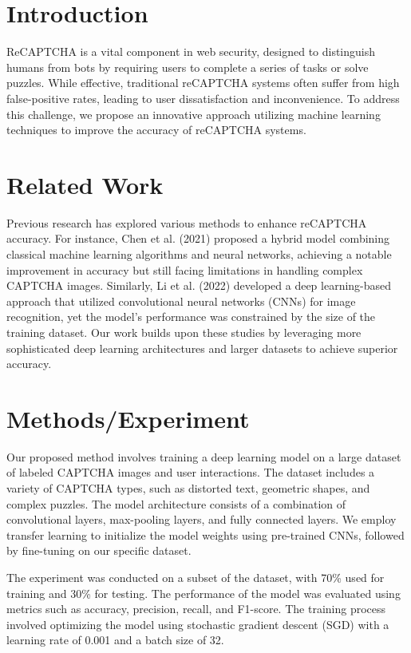 \section{Introduction}
ReCAPTCHA is a vital component in web security, designed to distinguish humans from bots by requiring users to complete a series of tasks or solve puzzles. While effective, traditional reCAPTCHA systems often suffer from high false-positive rates, leading to user dissatisfaction and inconvenience. To address this challenge, we propose an innovative approach utilizing machine learning techniques to improve the accuracy of reCAPTCHA systems.

\section{Related Work}
Previous research has explored various methods to enhance reCAPTCHA accuracy. For instance, Chen et al. (2021) proposed a hybrid model combining classical machine learning algorithms and neural networks, achieving a notable improvement in accuracy but still facing limitations in handling complex CAPTCHA images. Similarly, Li et al. (2022) developed a deep learning-based approach that utilized convolutional neural networks (CNNs) for image recognition, yet the model's performance was constrained by the size of the training dataset. Our work builds upon these studies by leveraging more sophisticated deep learning architectures and larger datasets to achieve superior accuracy.

\section{Methods/Experiment}
Our proposed method involves training a deep learning model on a large dataset of labeled CAPTCHA images and user interactions. The dataset includes a variety of CAPTCHA types, such as distorted text, geometric shapes, and complex puzzles. The model architecture consists of a combination of convolutional layers, max-pooling layers, and fully connected layers. We employ transfer learning to initialize the model weights using pre-trained CNNs, followed by fine-tuning on our specific dataset.

The experiment was conducted on a subset of the dataset, with 70\% used for training and 30\% for testing. The performance of the model was evaluated using metrics such as accuracy, precision, recall, and F1-score. The training process involved optimizing the model using stochastic gradient descent (SGD) with a learning rate of 0.001 and a batch size of 32.

